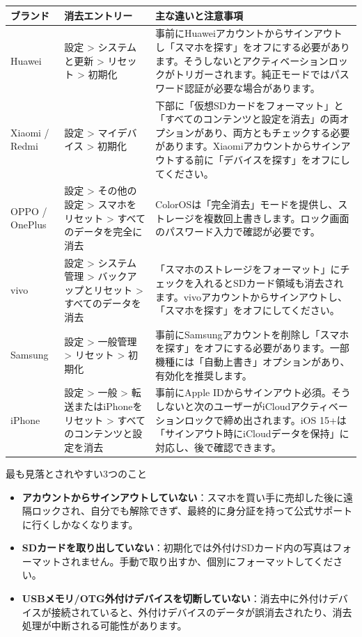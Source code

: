 \begin{center}
\begin{tabularx}{\linewidth}{|X|X|X|}
\hline
\textbf{ブランド} & \textbf{消去エントリー} & \textbf{主な違いと注意事項} \tabularnewline
\hline
Huawei & 設定 > システムと更新 > リセット > 初期化 & 事前にHuaweiアカウントからサインアウトし「スマホを探す」をオフにする必要があります。そうしないとアクティベーションロックがトリガーされます。純正モードではパスワード認証が必要な場合があります。 \tabularnewline
Xiaomi / Redmi & 設定 > マイデバイス > 初期化 & 下部に「仮想SDカードをフォーマット」と「すべてのコンテンツと設定を消去」の両オプションがあり、両方ともチェックする必要があります。Xiaomiアカウントからサインアウトする前に「デバイスを探す」をオフにしてください。 \tabularnewline
OPPO / OnePlus & 設定 > その他の設定 > スマホをリセット > すべてのデータを完全に消去 & ColorOSは「完全消去」モードを提供し、ストレージを複数回上書きします。ロック画面のパスワード入力で確認が必要です。 \tabularnewline
vivo & 設定 > システム管理 > バックアップとリセット > すべてのデータを消去 & 「スマホのストレージをフォーマット」にチェックを入れるとSDカード領域も消去されます。vivoアカウントからサインアウトし、「スマホを探す」をオフにしてください。 \tabularnewline
Samsung & 設定 > 一般管理 > リセット > 初期化 & 事前にSamsungアカウントを削除し「スマホを探す」をオフにする必要があります。一部機種には「自動上書き」オプションがあり、有効化を推奨します。 \tabularnewline
iPhone & 設定 > 一般 > 転送またはiPhoneをリセット > すべてのコンテンツと設定を消去 & 事前にApple IDからサインアウト必須。そうしないと次のユーザーがiCloudアクティベーションロックで締め出されます。iOS 15+は「サインアウト時にiCloudデータを保持」に対応し、後で確認できます。 \tabularnewline
\hline
\end{tabularx}
\end{center}

\begin{tcbwarn}{最も見落とされやすい3つのこと}
\begin{itemize}
  \item \textbf{アカウントからサインアウトしていない}：スマホを買い手に売却した後に遠隔ロックされ、自分でも解除できず、最終的に身分証を持って公式サポートに行くしかなくなります。
  \item \textbf{SDカードを取り出していない}：初期化では外付けSDカード内の写真はフォーマットされません。手動で取り出すか、個別にフォーマットしてください。
  \item \textbf{USBメモリ/OTG外付けデバイスを切断していない}：消去中に外付けデバイスが接続されていると、外付けデバイスのデータが誤消去されたり、消去処理が中断される可能性があります。
\end{itemize}

\end{tcbwarn}

